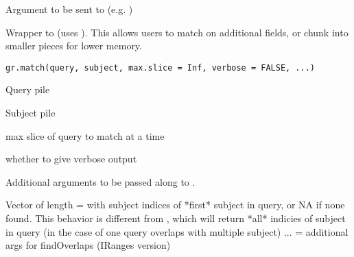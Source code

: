 \documentclass[a4paper]{book}
\begin{document}
%
\begin{Arguments}
\begin{ldescription}
\item[\code{query}] 

\item[\code{subject}] 

\item[\code{...}] Argument to be sent to  (e.g. )
\end{ldescription}
\end{Arguments}
%
\begin{Description}\relax
Wrapper to  (uses ). This allows users to
match on additional  fields, or chunk into smaller pieces for lower memory.
\end{Description}
%
\begin{Usage}
\begin{verbatim}
gr.match(query, subject, max.slice = Inf, verbose = FALSE, ...)
\end{verbatim}
\end{Usage}
%
\begin{Arguments}
\begin{ldescription}
\item[\code{query}] Query  pile

\item[\code{subject}] Subject  pile

\item[\code{max.slice}] max slice of query to match at a time

\item[\code{verbose}] whether to give verbose output

\item[\code{...}] Additional arguments to be passed along to .
\end{ldescription}
\end{Arguments}
%
\begin{Value}
Vector of length =  with subject indices of *first* subject in query, or NA if none found.
This behavior is different from , which will
return *all* indicies of subject in query (in the case of one query overlaps with multiple subject)
... = additional args for findOverlaps (IRanges version)
\end{Value}
\end{document}
